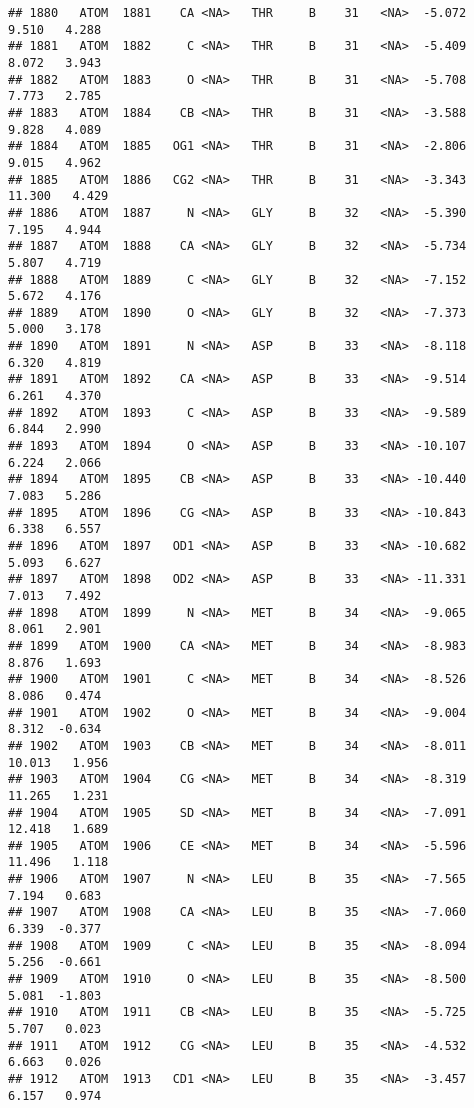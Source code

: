 \documentclass[
]{article}
\begin{document}
\begin{verbatim}
## 1880   ATOM  1881    CA <NA>   THR     B    31   <NA>  -5.072   9.510   4.288
## 1881   ATOM  1882     C <NA>   THR     B    31   <NA>  -5.409   8.072   3.943
## 1882   ATOM  1883     O <NA>   THR     B    31   <NA>  -5.708   7.773   2.785
## 1883   ATOM  1884    CB <NA>   THR     B    31   <NA>  -3.588   9.828   4.089
## 1884   ATOM  1885   OG1 <NA>   THR     B    31   <NA>  -2.806   9.015   4.962
## 1885   ATOM  1886   CG2 <NA>   THR     B    31   <NA>  -3.343  11.300   4.429
## 1886   ATOM  1887     N <NA>   GLY     B    32   <NA>  -5.390   7.195   4.944
## 1887   ATOM  1888    CA <NA>   GLY     B    32   <NA>  -5.734   5.807   4.719
## 1888   ATOM  1889     C <NA>   GLY     B    32   <NA>  -7.152   5.672   4.176
## 1889   ATOM  1890     O <NA>   GLY     B    32   <NA>  -7.373   5.000   3.178
## 1890   ATOM  1891     N <NA>   ASP     B    33   <NA>  -8.118   6.320   4.819
## 1891   ATOM  1892    CA <NA>   ASP     B    33   <NA>  -9.514   6.261   4.370
## 1892   ATOM  1893     C <NA>   ASP     B    33   <NA>  -9.589   6.844   2.990
## 1893   ATOM  1894     O <NA>   ASP     B    33   <NA> -10.107   6.224   2.066
## 1894   ATOM  1895    CB <NA>   ASP     B    33   <NA> -10.440   7.083   5.286
## 1895   ATOM  1896    CG <NA>   ASP     B    33   <NA> -10.843   6.338   6.557
## 1896   ATOM  1897   OD1 <NA>   ASP     B    33   <NA> -10.682   5.093   6.627
## 1897   ATOM  1898   OD2 <NA>   ASP     B    33   <NA> -11.331   7.013   7.492
## 1898   ATOM  1899     N <NA>   MET     B    34   <NA>  -9.065   8.061   2.901
## 1899   ATOM  1900    CA <NA>   MET     B    34   <NA>  -8.983   8.876   1.693
## 1900   ATOM  1901     C <NA>   MET     B    34   <NA>  -8.526   8.086   0.474
## 1901   ATOM  1902     O <NA>   MET     B    34   <NA>  -9.004   8.312  -0.634
## 1902   ATOM  1903    CB <NA>   MET     B    34   <NA>  -8.011  10.013   1.956
## 1903   ATOM  1904    CG <NA>   MET     B    34   <NA>  -8.319  11.265   1.231
## 1904   ATOM  1905    SD <NA>   MET     B    34   <NA>  -7.091  12.418   1.689
## 1905   ATOM  1906    CE <NA>   MET     B    34   <NA>  -5.596  11.496   1.118
## 1906   ATOM  1907     N <NA>   LEU     B    35   <NA>  -7.565   7.194   0.683
## 1907   ATOM  1908    CA <NA>   LEU     B    35   <NA>  -7.060   6.339  -0.377
## 1908   ATOM  1909     C <NA>   LEU     B    35   <NA>  -8.094   5.256  -0.661
## 1909   ATOM  1910     O <NA>   LEU     B    35   <NA>  -8.500   5.081  -1.803
## 1910   ATOM  1911    CB <NA>   LEU     B    35   <NA>  -5.725   5.707   0.023
## 1911   ATOM  1912    CG <NA>   LEU     B    35   <NA>  -4.532   6.663   0.026
## 1912   ATOM  1913   CD1 <NA>   LEU     B    35   <NA>  -3.457   6.157   0.974

\end{verbatim}
\end{document}
